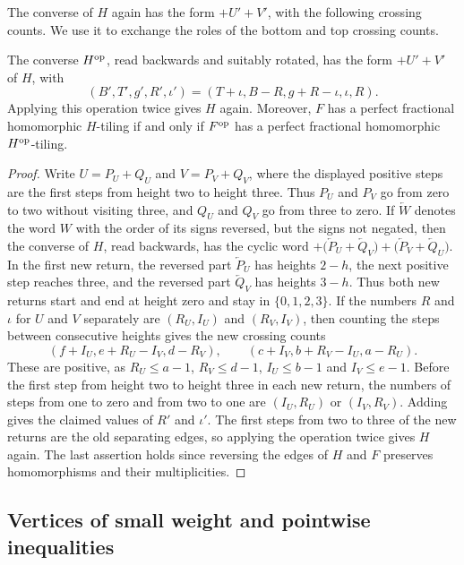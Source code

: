 The converse of $H$ again has the form $+U'+V'$, with the following crossing counts. We use it to exchange the roles of the bottom and top crossing counts.

\begin{lemma}
\label{compact390:literal-converse}
The converse $H^{\rm op}$, read backwards and suitably rotated, has the form $+U'+V'$ of $H$, with
\[
 (B',T',g',R',\iota')=(T+\iota,B-R,g+R-\iota,\iota,R).
\]
Applying this operation twice gives $H$ again.
Moreover, $F$ has a perfect fractional homomorphic $H$-tiling if and only if $F^{\rm op}$ has a perfect fractional homomorphic $H^{\rm op}$-tiling.
\end{lemma}
\begin{proof}
Write $U=P_U+Q_U$ and $V=P_V+Q_V$, where the displayed positive steps are the first steps from height two to height three. Thus $P_U$ and $P_V$ go
from zero to two without visiting three, and $Q_U$ and $Q_V$ go
from three to zero. If $\overleftarrow W$ denotes the word $W$ with the
order of its signs reversed, but the signs not negated, then the
converse of $H$, read backwards, has the cyclic word $+\bigl(\overleftarrow P_U+\overleftarrow Q_V\bigr) +\bigl(\overleftarrow P_V+\overleftarrow Q_U\bigr)$. In the first new return, the reversed part $\overleftarrow P_U$ has heights
$2-h$, the next positive step reaches three, and
the reversed part $\overleftarrow Q_V$ has heights $3-h$. Thus both new returns start and end at height zero and stay in $\{0,1,2,3\}$. If the numbers $R$ and $\iota$ for $U$ and $V$ separately are
$(R_U,I_U)$ and $(R_V,I_V)$, then counting the steps between consecutive heights gives the new
crossing counts
\[
 (f+I_U,e+R_U-I_V,d-R_V),\qquad
 (c+I_V,b+R_V-I_U,a-R_U).
\]
These are positive, as $R_U\le a-1$, $R_V\le d-1$, $I_U\le b-1$ and $I_V\le e-1$.
Before the first step from height two to height three in each new return, the numbers of steps from one to zero and from two to one are $(I_U,R_U)$ or
$(I_V,R_V)$. Adding gives the claimed values of $R'$ and $\iota'$.
The first steps from two to three of the new returns are the old separating edges, so applying the
operation twice gives $H$ again. The last assertion holds since reversing the edges of $H$ and $F$ preserves homomorphisms and their multiplicities.
\end{proof}


\subsection{Vertices of small weight and pointwise inequalities}
\label{compact390:compensation-section}
